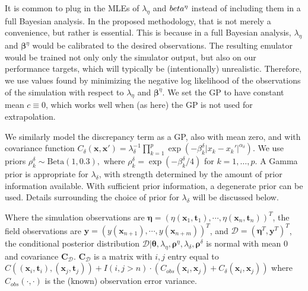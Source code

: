 \documentclass[12pt]{article}
\begin{document}
It is common to plug in the MLEs of $\lambda_\eta$ and $\boldsymbol \\beta^\eta$ instead of including them in a full Bayesian analysis.
%
In the proposed methodology, that is not merely a convenience, but rather is essential.
%
This is because in a full Bayesian analysis, $\lambda_\eta$ and $\boldsymbol\beta^\eta$ would be calibrated to the desired observations.
%
The resulting emulator would be trained not only only the simulator output, but also on our performance targets, which will typically be (intentionally) unrealistic.
%
Therefore, we use values found by minimizing the negative log likelihood of the observations of the simulation with respect to $\lambda_\eta$ and $\boldsymbol\beta^\eta$.
%
We set the GP to have constant mean $c\equiv0$, which works well when (as here) the GP is not used for extrapolation.
%

We similarly model the discrepancy term as a GP, also with mean zero, and with covariance function
%
$C_\delta(\mathbf x,\mathbf x') = \lambda_\delta^{-1} \prod_{k=1}^p
\exp\left( -\beta_k^\delta |x_k-x_k'|^{\alpha_\delta} \right).$
%
We use priors
$\rho^\delta_k \sim \mathrm{Beta}(1,0.3),$
where $\rho_k^\delta = \exp(-\beta_k^\delta/4)$ for $k=1,\ldots,p$. 
%
A Gamma prior is appropriate for $\lambda_\delta$, with strength determined by the amount of prior information available. 
%
With sufficient prior information, a degenerate prior can be used. 
%
Details surrounding the choice of prior for $\lambda_\delta$ will be discussed below.

Where the simulation observations are $\boldsymbol \eta = (\eta(\mathbf x_1,\mathbf t_1),\cdots,\eta(\mathbf x_n,\mathbf t_n))^T$, the field observations are $\mathbf y = (y(\mathbf x_{n+1}),\cdots,y(\mathbf x_{n+m}))^T$,
and $\mathcal D = (\boldsymbol \eta^T,\mathbf y^T)^T$, the conditional posterior distribution $\mathcal D | \boldsymbol \theta,\lambda_\eta, \boldsymbol \rho^\eta,\lambda_\delta,\boldsymbol \rho^\delta$ is normal with mean 0 and covariance $\mathbf C_\mathcal D$. 
%
$\mathbf C_\mathcal D$ is a matrix with $i,j$ entry equal to 
$
C((\mathbf x_i,\mathbf t_i),(\mathbf x_j,\mathbf t_j)) + I(i,j>n)\cdot(C_{obs}(\mathbf x_i,\mathbf x_j) + C_\delta(\mathbf x_i,\mathbf x_j))
$
where $C_{obs}(\cdot,\cdot)$ is the (known) observation error variance.
%
\end{document}
